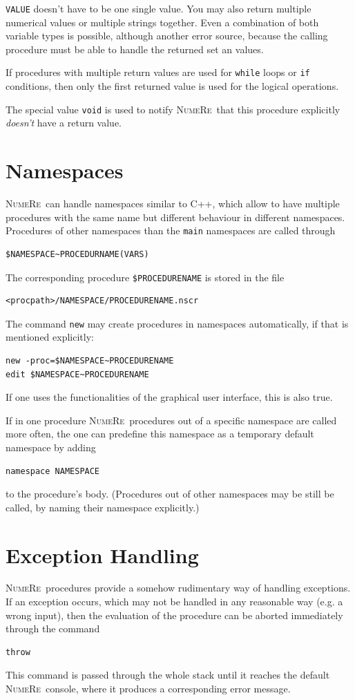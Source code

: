 \documentclass[DIV=14,headsepline,footsepline]{scrbook}
\newcommand{\NR}{\textsc{Nu\-me\-Re}}
\begin{document}
				\verb+VALUE+ doesn't have to be one single value. You may also return multiple numerical values or multiple strings together. Even a combination of both variable types is possible, although another error source, because the calling procedure must be able to handle the returned set an values.
				
				If procedures with multiple return values are used for \verb+while+ loops or \verb+if+ conditions, then only the first returned value is used for the logical operations.
				
				The special value \verb+void+ is used to notify \NR\ that this procedure explicitly \emph{doesn't} have a return value.
			\section{Namespaces}
				\NR\ can handle namespaces similar to C++, which allow to have multiple procedures with the same name but different behaviour in different namespaces. Procedures of other namespaces than the \verb+main+ namespaces are called through 
				\begin{lstlisting}
$NAMESPACE~PROCEDURNAME(VARS)
				\end{lstlisting}
				The corresponding procedure \verb+$PROCEDURENAME+ is stored in the file 
				\begin{lstlisting}
<procpath>/NAMESPACE/PROCEDURENAME.nscr
				\end{lstlisting}
				The command \verb+new+ may create procedures in namespaces automatically, if that is mentioned explicitly:
				\begin{lstlisting}
new -proc=$NAMESPACE~PROCEDURENAME
edit $NAMESPACE~PROCEDURENAME
				\end{lstlisting}
				If one uses the functionalities of the graphical user interface, this is also true.
				
				If in one procedure \NR\ procedures out of a specific namespace are called more often, the one can predefine this namespace as a temporary default namespace by adding
				\begin{lstlisting}
namespace NAMESPACE
				\end{lstlisting}
				to the procedure's body. (Procedures out of other namespaces may be still be called, by naming their namespace explicitly.)
			\section{Exception Handling}
				\NR\ procedures provide a somehow rudimentary way of handling exceptions. If an exception occurs, which may not be handled in any reasonable way (e.g. a wrong input), then the evaluation of the procedure can be aborted immediately through the command
				\begin{lstlisting}
throw
				\end{lstlisting}
				This command is passed through the whole stack until it reaches the default \NR\ console, where it produces a corresponding error message.
				
\end{document}
